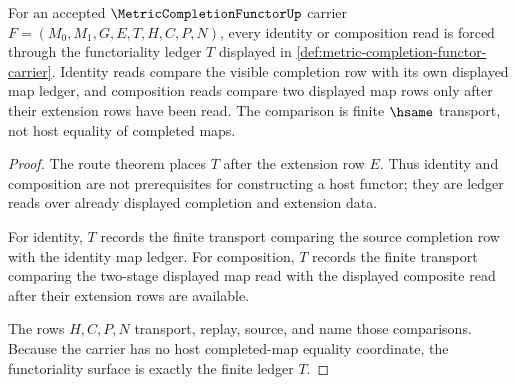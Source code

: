\begin{theorem}
\label{thm:metric-completion-functor-identity-composition-functoriality}
For an accepted $\MetricCompletionFunctorUp$ carrier
$F=(M_0,M_1,G,E,T,H,C,P,N)$, every identity or composition read is forced
through the functoriality ledger $T$ displayed in
\autoref{def:metric-completion-functor-carrier}. Identity reads compare the
visible completion row with its own displayed map ledger, and composition
reads compare two displayed map rows only after their extension rows have
been read. The comparison is finite $\hsame$ transport, not host equality of
completed maps.
\end{theorem}
\begin{proof}
The route theorem places $T$ after the extension row $E$. Thus identity and
composition are not prerequisites for constructing a host functor; they are
ledger reads over already displayed completion and extension data.

For identity, $T$ records the finite transport comparing the source completion
row with the identity map ledger. For composition, $T$ records the finite
transport comparing the two-stage displayed map read with the displayed
composite read after their extension rows are available.

The rows $H,C,P,N$ transport, replay, source, and name those comparisons.
Because the carrier has no host completed-map equality coordinate, the
functoriality surface is exactly the finite ledger $T$.
\end{proof}


\begin{closurestatus}{\MetricCompletionFunctorUp}
  \theoryclosure{\seedClosure}
  \formalstatus{\unformalizedV}
\end{closurestatus}
